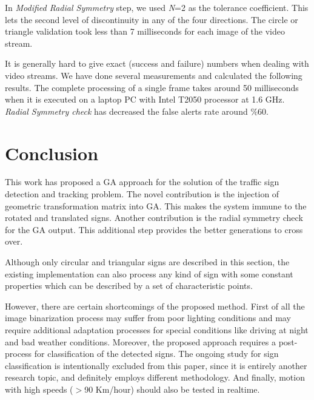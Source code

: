 \documentclass[twocolumn,letterpaper,10pt]{article}
\begin{document}
In \textit{Modified Radial Symmetry} step, we used \textit{N}=2 as the tolerance coefficient. This lets the second level of discontinuity in any of the four directions. The circle or triangle validation took less than 7 milliseconds for each image of the video stream. 
\par
It is generally hard to give exact (success and failure) numbers when dealing with video streams. We have done several measurements and calculated the following results. The complete processing of a single frame takes around 50 milliseconds when it is executed on a laptop PC with Intel T2050 processor at 1.6 GHz. \textit{Radial Symmetry check} has decreased the false alerts rate around $\%$60. 

\section{Conclusion}
This work has proposed a GA approach for the solution of the traffic sign detection and tracking problem. 
The novel contribution is the injection of geometric transformation matrix into GA. This makes the system immune to the rotated and translated signs.  Another contribution is the radial symmetry check for the GA output. This additional step provides the better generations to cross over. 

Although only circular and triangular signs are described in this section, the existing implementation can also process any kind of sign with some constant properties which can be described by a set of characteristic points. 

However, there are certain shortcomings of the proposed method. First of all the image binarization process may suffer from poor lighting conditions and may require additional adaptation processes for special conditions like driving at night and bad weather conditions. Moreover, the proposed approach requires a post-process for classification of the detected signs. The ongoing study for sign classification is intentionally excluded from this paper, since it is entirely another research topic, and definitely employs different methodology. And finally, motion with high speeds ($>$90 Km/hour) should also be tested in realtime.

	
\end{document}
